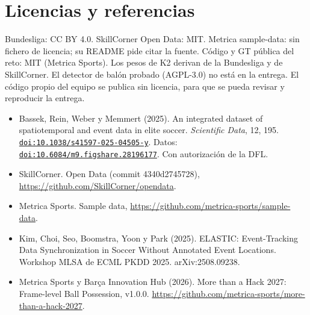 \documentclass[10pt,a4paper]{article}
\begin{document}
\section{Licencias y referencias}\label{sec:8}

Bundesliga: CC BY 4.0. SkillCorner Open Data: MIT. Metrica sample-data: sin fichero de licencia; su README pide citar la fuente. Código y GT pública del reto: MIT (Metrica Sports). Los pesos de K2 derivan de la Bundesliga y de SkillCorner. El detector de balón probado (AGPL-3.0) no está en la entrega. El código propio del equipo se publica sin licencia, para que se pueda revisar y reproducir la entrega.

\begin{itemize}
  \item Bassek, Rein, Weber y Memmert (2025). An integrated dataset of spatiotemporal and event data in elite soccer. \emph{Scientific Data}, 12, 195. \href{https://doi.org/10.1038/s41597-025-04505-y}{\nolinkurl{doi:10.1038/s41597-025-04505-y}}. Datos: \href{https://doi.org/10.6084/m9.figshare.28196177}{\nolinkurl{doi:10.6084/m9.figshare.28196177}}. Con autorización de la DFL.
  \item SkillCorner. Open Data (commit 4340d2745728), \url{https://github.com/SkillCorner/opendata}.
  \item Metrica Sports. Sample data, \url{https://github.com/metrica-sports/sample-data}.
  \item Kim, Choi, Seo, Boomstra, Yoon y Park (2025). ELASTIC: Event-Tracking Data Synchronization in Soccer Without Annotated Event Locations. Workshop MLSA de ECML PKDD 2025. arXiv:2508.09238.
  \item Metrica Sports y Barça Innovation Hub (2026). More than a Hack 2027: Frame-level Ball Possession, v1.0.0. \url{https://github.com/metrica-sports/more-than-a-hack-2027}.
\end{itemize}
\end{document}
